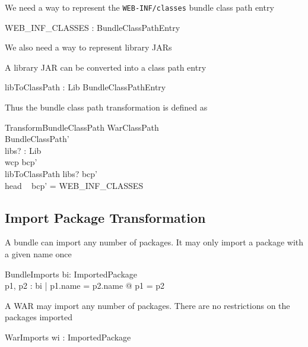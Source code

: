\documentclass[a4paper,12pt]{article}
\begin{document}
We need a way to represent the {\tt WEB-INF/classes} bundle class path entry 

\begin{axdef}
WEB\_INF\_CLASSES : BundleClassPathEntry \\ 
\end{axdef}

We also need a way to represent library JARs

\begin{zed}
	[Lib]
\end{zed}

A library JAR can be converted into a class path entry

\begin{axdef}
libToClassPath : Lib \fun BundleClassPathEntry \\
\end{axdef}

Thus the bundle class path transformation is defined as 

\begin{schema}{TransformBundleClassPath}
WarClassPath \\
BundleClassPath' \\
libs? : \power Lib \\
\where
\ran wcp \subseteq \ran bcp' \\
libToClassPath \limg libs? \rimg \subseteq \ran bcp' \\
head ~ bcp' = WEB\_INF\_CLASSES \\
\end{schema}

\subsection{Import Package Transformation}

A bundle can import any number of packages. It may only import a package with a given name once

\begin{schema}{BundleImports}
bi: \power ImportedPackage \\
\where
\forall p1, p2 : bi | p1.name = p2.name @ p1 = p2 \\
\end{schema}

A WAR may import any number of packages. There are no restrictions on the packages imported

\begin{schema}{WarImports}
wi : \power ImportedPackage \\
\end{schema}
\end{document}
